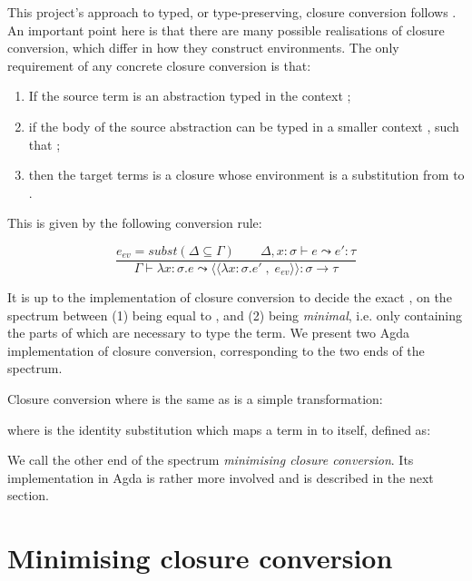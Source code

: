 \documentclass[bsc,frontabs,oneside,singlespacing,parskip,deptreport]{infthesis}
\theoremstyle{definition}
\theoremstyle{lemma}
\begin{document}
This project's approach to typed, or type-preserving, closure
conversion follows \cite{DBLP:conf/popl/MinamideMH96}. An important
point here is that there are many possible realisations of closure
conversion, which differ in how they construct environments. The only
requirement of any concrete closure conversion is that:

\begin{enumerate}
\item If the source term is an abstraction typed in the context
  ;
\item if the body of the source abstraction can be typed in a smaller
  context , such that ;
\item then the target terms is a closure whose environment is a
  substitution from  to .
\end{enumerate}

This is given by the following conversion rule:

\[
  \frac
  {e_{ev} = subst (\Delta \subseteq \Gamma) \quad \quad \Delta , x : \sigma \vdash e \leadsto e' : \tau }
  {\Gamma \vdash \lambda x : \sigma . e \leadsto
    \langle\langle \lambda x : \sigma . e' \; , \; e_{ev} \rangle\rangle : \sigma \rightarrow \tau}
\]

It is up to the implementation of closure conversion to decide the
exact , on the spectrum between (1)  being equal to
, and (2)  being \textit{minimal}, i.e. only containing
the parts of  which are necessary to type the term. We present
two Agda implementation of closure conversion, corresponding to the
two ends of the spectrum.

Closure conversion where  is the same as  is a simple
transformation:


where  is the identity substitution which maps a term
in  to itself, defined as:


We call the other end of the spectrum \textit{minimising closure
  conversion}. Its implementation in Agda is rather more involved and
is described in the next section.

\section{Minimising closure conversion}
\label{sec:minim-clos-conv}
\end{document}
